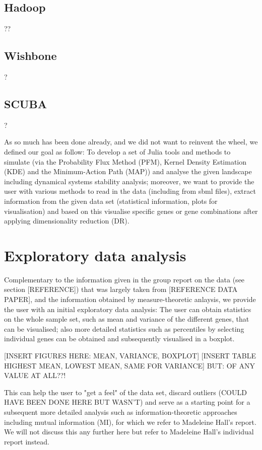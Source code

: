 \documentclass[journal, a4paper]{IEEEtran}
\begin{document}
\subsection{Hadoop}??
\subsection{Wishbone}?
\subsection{SCUBA}?

As so much has been done already, and we did not want to reinvent the wheel, we defined our goal as follow: To develop a set of Julia tools and methods to simulate (via the Probability Flux Method (PFM), Kernel Density Estimation (KDE) and the Minimum-Action Path (MAP)) and analyse the given landscape including dynamical systems stability analysis; moreover, we want to provide the user with various methods to read in the data (including from sbml files), extract information from the given data set (statistical information, plots for visualisation) and based on this visualise specific genes or gene combinations after applying dimensionality reduction (DR). 


\section{Exploratory data analysis}

Complementary to the information given in the group report on the data (see section [REFERENCE]) that was largely taken from [REFERENCE DATA PAPER], and the information obtained by measure-theoretic anlaysis, we provide the user with an initial exploratory data analysis:
The user can obtain statistics on the whole sample set, such as mean and variance of the different genes, that can be visualised; also more detailed statistics such as percentiles by selecting individual genes can be obtained and subsequently visualised in a boxplot.

[INSERT FIGURES HERE: MEAN, VARIANCE, BOXPLOT] 
[INSERT TABLE HIGHEST MEAN, LOWEST MEAN, SAME FOR VARIANCE]
BUT: OF ANY VALUE AT ALL??!

This can help the user to "get a feel" of the data set, discard outliers (COULD HAVE BEEN DONE HERE BUT WASN'T) and serve as a starting point for a subsequent more detailed analysis such as information-theoretic approaches including mutual information (MI), for which we refer to Madeleine Hall's report. We will not discuss this any further here but refer to Madeleine Hall's individual report instead.
\end{document}
